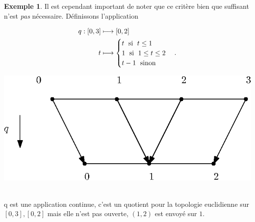 \documentclass[12pt]{book}
\theoremstyle{definition}
\newtheorem{example}[lemma]{Exemple}
\theoremstyle{remark}
\begin{document}
	\begin{example}
		Il est cependant important de noter que ce critère bien que suffisant n'est \emph{pas} nécessaire. Définissons l'application\\

		\noindent \begin{minipage}{0.5\textwidth}
		\begin{align*}
			q : [0,3] &\longmapsto [0,2]\\
			t &\longmapsto \begin{cases}
				t \text{\; si \;} t \le 1\\
				1 \text{\; si \;} 1 \le t \le 2\\
				t-1 \text{\; sinon}
			\end{cases}
		.\end{align*}
		\end{minipage}
		\hfill
		\noindent \begin{minipage}{0.5\textwidth}
			\includegraphics[width=\linewidth]{example_1.eps}
		\end{minipage}\\

		q est une application continue, c'est un quotient pour la topologie euclidienne sur $[0,3], [0,2]$ mais elle n'est pas ouverte,  $(1,2)$ est envoyé sur ${1}$.
	\end{example}
\end{document}
